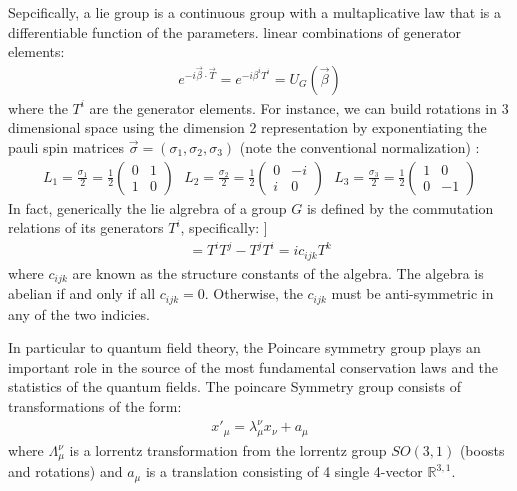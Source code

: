Sepcifically, a lie group is a continuous group with a multaplicative 
law that is a differentiable function of the parameters. linear combinations of generator elements:
\begin{align*}
e^{-i\vec \beta \cdot \vec T} = e^{-i\beta^i T^i} = U_{G}(\vec \beta)
\end{align*}
where the $T^i$ are the generator elements. 
For instance, we can build rotations in 3 dimensional space 
using the dimension 2 representation by exponentiating the pauli spin matrices $\vec \sigma = (\sigma_1, \sigma_2, \sigma_3)$ 
(note the conventional normalization) :
\begin{align*}
L_1 = \frac{\sigma_1}{2} = \frac{1}{2} \begin{pmatrix} 0 & 1 \\ 1 & 0 \end{pmatrix} \text{  }
L_2 = \frac{\sigma_2}{2} = \frac{1}{2} \begin{pmatrix} 0 & -i \\ i & 0 \end{pmatrix} \text{  } 
L_3 = \frac{\sigma_3}{2} =  \frac{1}{2} \begin{pmatrix} 1 & 0 \\ 0 & -1 \end{pmatrix} 
\end{align*}
In fact, generically the lie algrebra of a group $G$ is defined by the commutation relations of its generators $T^i$, 
specifically:
]\begin{align*}
[T^i, T^j] = T^iT^j - T^jT^i=  i c_{ijk} T^k
\end{align*}
where $c_{ijk}$ are known as the structure constants of the algebra. The algebra is abelian 
if and only if all $c_{ijk}=0$. Otherwise, the $c_{ijk}$ must be anti-symmetric in any of the two indicies. 

In particular to quantum field theory, the Poincare symmetry group plays an important role in the 
source of the most fundamental conservation laws and the statistics of the quantum fields. 
The poincare Symmetry group consists of transformations of the form:
\begin{align*}
x'_\mu = \lambda^\nu_\mu x_\nu + a_\mu 
\end{align*}
where $\Lambda^\nu_\mu$ is a lorrentz transformation from the lorrentz group $SO(3,1)$ (boosts and rotations) and 
$a_\mu$ is a translation consisting of 4 single 4-vector $\mathbb{R}^{3,1}$. 

